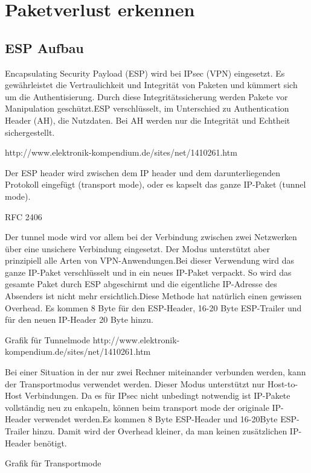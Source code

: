 \section{Paketverlust erkennen}
\label{sec:Paketverlust erkennen}

\subsection{ESP Aufbau}
\noindent Encapsulating Security Payload (ESP) wird bei IPsec (VPN) eingesetzt. Es gewährleistet die Vertraulichkeit und Integrität von Paketen und kümmert sich um die Authentisierung. Durch diese Integritätssicherung werden Pakete vor Manipulation geschützt.ESP verschlüsselt, im Unterschied zu Authentication Header (AH), die Nutzdaten. Bei AH werden nur die Integrität und Echtheit sichergestellt.

\noindent http://www.elektronik-kompendium.de/sites/net/1410261.htm

\noindent Der ESP header wird zwischen dem IP header und dem darunterliegenden Protokoll eingefügt (transport mode), oder es kapselt das ganze IP-Paket (tunnel mode).

\noindent RFC 2406

\noindent Der tunnel mode wird vor allem bei der Verbindung zwischen zwei Netzwerken über eine unsichere Verbindung eingesetzt. Der Modus unterstützt aber prinzipiell alle Arten von VPN-Anwendungen.Bei dieser Verwendung wird das ganze IP-Paket verschlüsselt und in ein neues IP-Paket verpackt. So wird das gesamte Paket durch ESP abgeschirmt und die eigentliche IP-Adresse des Absenders ist nicht mehr ersichtlich.Diese Methode hat natürlich einen gewissen Overhead. Es kommen 8 Byte für den ESP-Header, 16-20 Byte ESP-Trailer und für den neuen IP-Header 20 Byte hinzu.


\noindent Grafik für Tunnelmode
\noindent http://www.elektronik-kompendium.de/sites/net/1410261.htm

\noindent Bei einer Situation in der nur zwei Rechner miteinander verbunden werden, kann der Transportmodus verwendet werden. Dieser Modus unterstützt nur Host-to-Host Verbindungen. Da es für IPsec nicht unbedingt notwendig ist IP-Pakete vollständig neu zu enkapeln, können beim transport mode der originale IP-Header verwendet werden.Es kommen 8 Byte ESP-Header und 16-20Byte ESP-Trailer hinzu. Damit wird der Overhead kleiner, da man keinen zusätzlichen IP-Header benötigt.

\noindent Grafik für Transportmode

